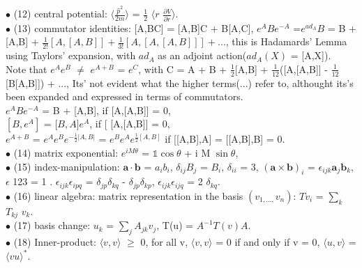 \documentclass[10pt,fancy]{elegantbook}
\begin{document}
{$\bullet$ (12) central potential: $\langle \frac{\hat{p}^2}{2m} \rangle$ = $\frac{1}{2}$ $\langle{r}$ $\frac{\partial{V}}{\partial{r}} \rangle $.  \\

$\bullet$ (13) commutator identities:  
[A,BC] = [A,B]C + B[A,C],  
$e^A Be^{-A}$  =$e^{ad_A}B$ = B + [A,B] + $\frac{1}{2!} [A,[A,B]] + \frac{1}{3!} [A,[A,[A,B]]] +...$, this is Hadamards' Lemma using Taylors' expansion, with $ad_A$ as an adjoint action($ad_A(X)$ = [A,X]). \\ 
Note that $e^A$$e^B$ $\neq$ $e^{A + B}$ = $e^C$, with C = A + B + $\frac{1}{2}$[A,B] + $\frac{1}{12}$([A,[A,B]] - $\frac{1}{12}$[B[A,B]]) + ...,  
Its' not evident what the higher terms(...) refer to, althought its's been expanded and expressed in terms of commutators. \\ 
$e^A Be^{-A}$ = B + [A,B], if  [A,[A,B]] = 0, \\ 
$[B,e^A]$ = [$B,A]e^A$, if [ [A,[A,B]] = 0, \\ 
$e^{A + B}$ = $e^A e^B e^{-\frac{1}{2}|A,B|}$ = $e^B e^A e^{\frac{1}{2}[A,B]}$ if [[A,B],A] = [[A,B],B] = 0. \\

$\bullet$ (14) matrix exponential: $e^{i M \theta}$ = $\mathbb 1 \cos \theta$ + i M $\sin \theta$,  \\

$\bullet$ (15) index-manipulation: $\mathbf a \cdot \mathbf b$ = $a_i b_i$, $\delta_{ij} B_j$ = $B_i$, $\delta_{ii}$ = 3, ${(\mathbf a \times \mathbf b)}_i$ = $\epsilon_{ijk} \mathbf a_j \mathbf b_k$, $\epsilon$ 123 = 1 .   
$\epsilon_{ijk} \epsilon_{ipq}$ = $\delta_{jp} \delta_{kq}$ - $\delta_{jp} \delta_{kp}$,  
$\epsilon_{ijk} \epsilon_{ijq}$ = 2 $\delta_{kq}$. \\

$\bullet$ (16) linear algebra: matrix representation in the basis $(v_{1,...,}v_n)$: $Tv_i$ = $\sum_k $ $T_{kj}$ $v_k$.  \\

$\bullet$ (17) basis change: $u_k$ = $\sum_j A_{jk}v_j$, T({u}) = $A^{-1} T ({v}) A$.  \\

$\bullet$ (18) Inner-product: $\langle{v,v} \rangle$ $\geq$ 0, for all v, $\langle{v,v} \rangle$ = 0 if and only if v = 0, $\langle{u,v} \rangle$ = $\langle{vu} \rangle^*$.  \\

}
\end{document}
